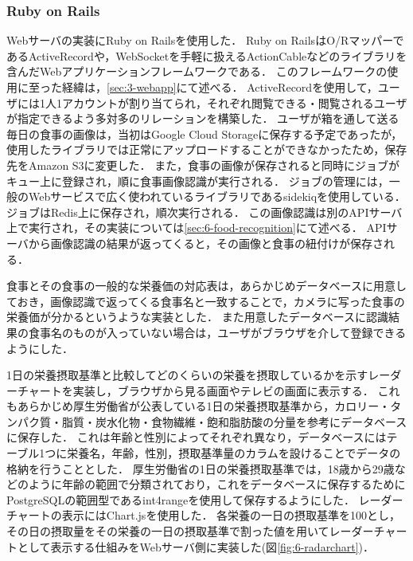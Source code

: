 \documentclass[../report]{subfiles}
\begin{document}
\subsubsection{Ruby on Rails}
Webサーバの実装にRuby on Railsを使用した．
Ruby on RailsはO/RマッパーであるActiveRecordや，WebSocketを手軽に扱えるActionCableなどのライブラリを含んだWebアプリケーションフレームワークである．
このフレームワークの使用に至った経緯は，\ref{sec:3-webapp}にて述べる．
ActiveRecordを使用して，ユーザには1人1アカウントが割り当てられ，それぞれ閲覧できる・閲覧されるユーザが指定できるよう多対多のリレーションを構築した．
ユーザが箱を通して送る毎日の食事の画像は，当初はGoogle Cloud Storageに保存する予定であったが，使用したライブラリでは正常にアップロードすることができなかったため，保存先をAmazon S3に変更した．
また，食事の画像が保存されると同時にジョブがキュー上に登録され，順に食事画像認識が実行される．
ジョブの管理には，一般のWebサービスで広く使われているライブラリであるsidekiqを使用している．
ジョブはRedis上に保存され，順次実行される．
この画像認識は別のAPIサーバ上で実行され，その実装については\ref{sec:6-food-recognition}にて述べる．
APIサーバから画像認識の結果が返ってくると，その画像と食事の紐付けが保存される．

食事とその食事の一般的な栄養価の対応表は，あらかじめデータベースに用意しておき，画像認識で返ってくる食事名と一致することで，カメラに写った食事の栄養価が分かるというような実装とした．
また用意したデータベースに認識結果の食事名のものが入っていない場合は，ユーザがブラウザを介して登録できるようにした．

1日の栄養摂取基準と比較してどのくらいの栄養を摂取しているかを示すレーダーチャートを実装し，ブラウザから見る画面やテレビの画面に表示する．
これもあらかじめ厚生労働省が公表している1日の栄養摂取基準から，カロリー・タンパク質・脂質・炭水化物・食物繊維・飽和脂肪酸の分量を参考にデータベースに保存した．
これは年齢と性別によってそれぞれ異なり，データベースにはテーブル1つに栄養名，年齢，性別，摂取基準量のカラムを設けることでデータの格納を行うこととした．
厚生労働省の1日の栄養摂取基準では，18歳から29歳などのように年齢の範囲で分類されており，これをデータベースに保存するためにPostgreSQLの範囲型であるint4rangeを使用して保存するようにした．
レーダーチャートの表示にはChart.jsを使用した．
各栄養の一日の摂取基準を100とし，その日の摂取量をその栄養の一日の摂取基準で割った値を用いてレーダーチャートとして表示する仕組みをWebサーバ側に実装した(図\ref{fig:6-radarchart})．
\end{document}
